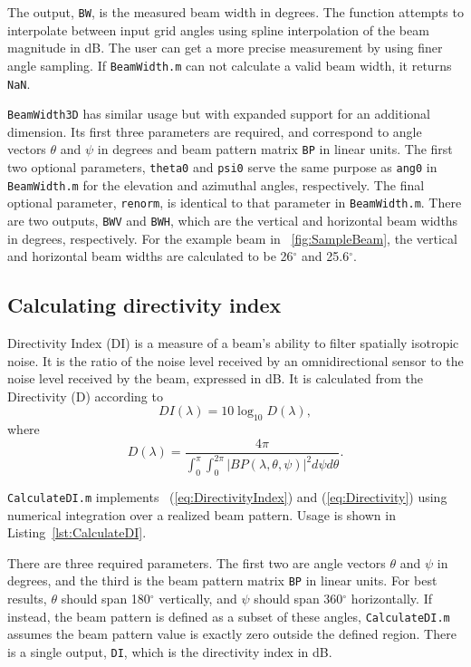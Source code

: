 The output, \texttt{BW}, is the measured beam width in degrees. The function attempts to interpolate between input grid angles using spline interpolation of the beam magnitude in dB. The user can get a more precise measurement by using finer angle sampling. If \texttt{BeamWidth.m} can not calculate a valid beam width, it returns \texttt{NaN}.

\texttt{BeamWidth3D} has similar usage but with expanded support for an additional dimension. Its first three parameters are required, and correspond to angle vectors $\theta$ and $\psi$ in degrees and beam pattern matrix \texttt{BP} in linear units. The first two optional parameters, \texttt{theta0} and \texttt{psi0} serve the same purpose as \texttt{ang0} in \texttt{BeamWidth.m} for the elevation and azimuthal angles, respectively. The final optional parameter, \texttt{renorm}, is identical to that parameter in \texttt{BeamWidth.m}. There are two outputs, \texttt{BWV} and \texttt{BWH}, which are the vertical and horizontal beam widths in degrees, respectively. For the example beam in \figname~\ref{fig:SampleBeam}, the vertical and horizontal beam widths are calculated to be 26$^\circ$ and 25.6$^\circ$.

\subsection{Calculating directivity index}

Directivity Index (DI) is a measure of a beam's ability to filter spatially isotropic noise. It is the ratio of the noise level received by an omnidirectional sensor to the noise level received by the beam, expressed in dB. It is calculated from the Directivity (D) according to
\begin{equation}
DI(\lambda) = 10\log_{10}D(\lambda),\label{eq:DirectivityIndex}
\end{equation}
where
\begin{equation}
D(\lambda) = \frac{4\pi}{\int_0^{\pi}\int_0^{2\pi}|BP(\lambda,\theta,\psi)|^2d\psi{d\theta}}.\label{eq:Directivity}
\end{equation}

\texttt{CalculateDI.m} implements \eqnnames~(\ref{eq:DirectivityIndex}) and (\ref{eq:Directivity}) using numerical integration over a realized beam pattern. Usage is shown in Listing~\ref{lst:CalculateDI}.

There are three required parameters. The first two are angle vectors $\theta$ and $\psi$ in degrees, and the third is the beam pattern matrix \texttt{BP} in linear units. For best results, $\theta$ should span 180$^\circ$ vertically, and $\psi$ should span 360$^\circ$ horizontally. If instead, the beam pattern is defined as a subset of these angles, \texttt{CalculateDI.m} assumes the beam pattern value is exactly zero outside the defined region. There is a single output, \texttt{DI}, which is the directivity index in dB.

